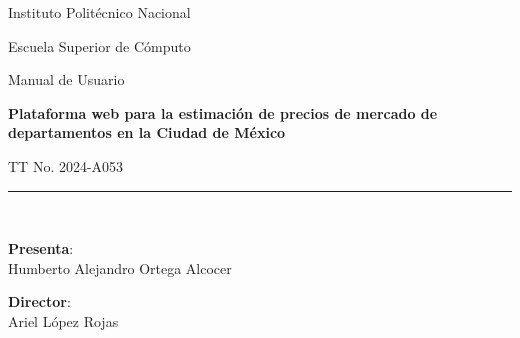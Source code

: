 \documentclass[12pt, a4paper, titlepage]{report} %
\begin{document}
\begin{titlepage}
    \vspace*{.25cm}
		\begin{center}
			\begin{LARGE}
				\textcolor{guindapoli}{Instituto Politécnico Nacional}\\
			\end{LARGE}
			\vspace*{0.2in}
			\begin{Large}
				\textcolor{azulescom}{Escuela Superior de Cómputo}\\
			\end{Large}
			\vspace*{0.4in}
			\begin{large}
			  Manual de Usuario
			\end{large}

			\vspace*{0.2in}

			\begin{Large}
				\textbf{Plataforma web para la estimación de precios de mercado de departamentos en la Ciudad de México}\\
			\end{Large}
			\vspace*{0.2in}
			\begin{large}
				TT No. 2024-A053\\
			\end{large}
			\vspace*{0.2in}
			\rule{80mm}{.1mm}\\
			\vspace*{0.1in}
			\begin{large}
				\begin{center}
					\textbf{Presenta}:\\
					Humberto Alejandro Ortega Alcocer\\
				\end{center}
			\end{large}
			\begin{large}
				\textbf{Director}:\\
				Ariel López Rojas\\
			\end{large}
		\end{center}
	\end{titlepage}

  \renewcommand\appendixpagename{Índice}
  \renewcommand\appendixtocname{Índice}
\end{document}
